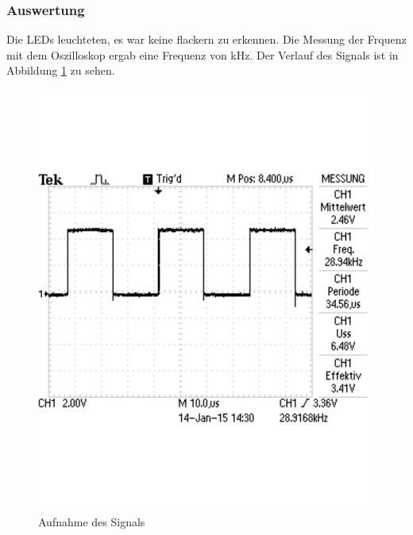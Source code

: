 \documentclass[12pt,a4paper]{article}
\begin{document}
\subsubsection*{Auswertung}

Die LEDs leuchteten, es war keine flackern zu erkennen. Die Messung der Frquenz mit dem Oszilloskop ergab eine Frequenz von \unit[28,9]{kHz}. Der Verlauf des Signals ist in Abbildung \ref{fig:g_2} zu sehen.

\begin{figure}[H] 
  \centering 	
    \includegraphics[trim = 0mm 50mm 0mm 50mm, clip, scale = 0.4]{TEK0001.pdf}
  	\caption[Aufnahme des Signals]{Aufnahme des Signals} 
  \label{fig:g_2}
\end{figure}
\end{document}
